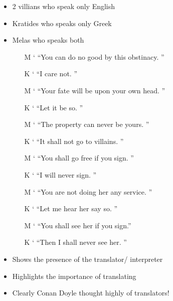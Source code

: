 \documentclass[a4paper,landscape,headrule,footrule,xetex]{foils}
\begin{document}
\begin{itemize}
\item 2 villians who speak only English
\item Kratides who speaks only Greek
\item Melas who speaks both 
  
  \newpage
  \newcommand{\TRNS}[1]{\uwave{\textcolor{blue}{#1}}}
  \begin{itemize}
    \item[M] ` ``You can do no good by this obstinacy. \TRNS{Who are you?}''
\item[K] ` ``I care not. \TRNS{I am a stranger in London.}''
\item[M] ` ``Your fate will be upon your own head. \TRNS{How long have you been
     here?}''
\item[K] ` ``Let it be so. \TRNS{Three weeks.}''
\item[M] ` ``The property can never be yours. \TRNS{What ails you?}''
\item[K] ` ``It shall not go to villains. \TRNS{They are starving me.}''
\item[M] ` ``You shall go free if you sign. \TRNS{What house is this?}''
\item[K] ` ``I will never sign. \TRNS{I do not know.}''
\item[M] ` ``You are not doing her any service. \TRNS{What is your name?}''
\item[K] ` ``Let me hear her say so. \TRNS{Kratides.}''
\item[M] ` ``You shall see her if you sign.\TRNS{Where are you from?}''
\item[K] ` ``Then I shall never see her. \TRNS{Athens.}''
\end{itemize}
\item Shows the presence of the translator/ interpreter
\item Highlights the importance of translating
\item Clearly Conan Doyle thought highly of translators!
\end{itemize}

\end{document}
